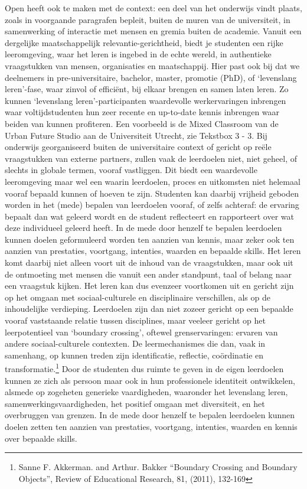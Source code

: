 \documentclass{jote-book}
\begin{document}
	Open heeft ook te maken met de context: een deel van het onderwijs vindt plaats, zoals in voorgaande paragrafen bepleit, buiten de muren van de universiteit, in samenwerking of interactie met mensen en gremia buiten de academie. Vanuit een dergelijke maatschappelijk relevantie-gerichtheid, biedt je studenten een rijke leeromgeving, waar het leren is ingebed in de echte wereld, in authentieke vraagstukken van mensen, organisaties en maatschappij. Hier past ook bij dat we deelnemers in pre-universitaire, bachelor, master, promotie (PhD), of ‘levenslang leren'-fase, waar zinvol of efficiënt, bij elkaar brengen en samen laten leren. Zo kunnen ‘levenslang leren'-participanten waardevolle werkervaringen inbrengen waar voltijdstudenten hun zeer recente en up-to-date kennis inbrengen waar beiden van kunnen profiteren. Een voorbeeld is de Mixed Classroom van de Urban Future Studio aan de Universiteit Utrecht, zie Tekstbox 3 - 3. Bij onderwijs georganiseerd buiten de universitaire context of gericht op reële vraagstukken van externe partners, zullen vaak de leerdoelen niet, niet geheel, of slechts in globale termen, vooraf vastliggen. Dit biedt een waardevolle leeromgeving maar wel een waarin leerdoelen, proces en uitkomsten niet helemaal vooraf bepaald kunnen of hoeven te zijn. Studenten kan daarbij vrijheid geboden worden in het (mede) bepalen van leerdoelen vooraf, of zelfs achteraf: de ervaring bepaalt dan wat geleerd wordt en de student reflecteert en rapporteert over wat deze individueel geleerd heeft. In de mede door henzelf te bepalen leerdoelen kunnen doelen geformuleerd worden ten aanzien van kennis, maar zeker ook ten aanzien van prestaties, voortgang, intenties, waarden en bepaalde skills. Het leren komt daarbij niet alleen voort uit de inhoud van de vraagstukken, maar ook uit de ontmoeting met mensen die vanuit een ander standpunt, taal of belang naar een vraagstuk kijken. Het leren kan dus evenzeer voortkomen uit en gericht zijn op het omgaan met sociaal-culturele en disciplinaire verschillen, als op de inhoudelijke verdieping. Leerdoelen zijn dan niet zozeer gericht op een bepaalde vooraf vaststaande relatie tussen disciplines, maar veeleer gericht op het leerpotentieel van ‘boundary crossing', oftewel grenservaringen: ervaren van andere sociaal-culturele contexten. De leermechanismes die dan, vaak in samenhang, op kunnen treden zijn identificatie, reflectie, coördinatie en transformatie.\footnote{Sanne F. Akkerman. and Arthur. Bakker “Boundary Crossing and Boundary Objects”, Review of Educational Research, 81, (2011), 132-169} Door de studenten dus ruimte te geven in de eigen leerdoelen kunnen ze zich als persoon maar ook in hun professionele identiteit ontwikkelen, alsmede op zogeheten generieke vaardigheden, waaronder het levenslang leren, samenwerkingsvaardigheden, het positief omgaan met diversiteit, en het overbruggen van grenzen. In de mede door henzelf te bepalen leerdoelen kunnen doelen zetten ten aanzien van prestaties, voortgang, intenties, waarden en kennis over bepaalde skills.
\end{document}
